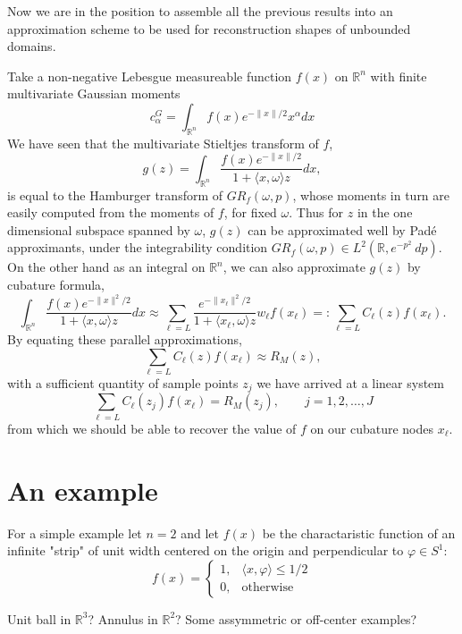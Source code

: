 \documentclass{amsart}
\theoremstyle{remark}
\numberwithin{equation}{section}
\newcommand{\RR}{\mathbb{R}}
\begin{document}



Now we are in the position to assemble all the previous results into an approximation scheme to be used for reconstruction shapes of unbounded domains.

Take a non-negative Lebesgue measureable function $f(x)$ on $\RR^n$ with finite multivariate Gaussian moments
\[
    c^G_\alpha = \int_{\RR^n} f(x)e^{-\|x\|/2} x^\alpha dx
\]
We have seen that the multivariate Stieltjes transform of $f$, 
\[
    g(z) = \int_{\RR^n} \frac{f(x)e^{-\|x\|/2}}{1 + \langle x, \omega \rangle z} dx,
\]
is equal to the Hamburger transform of $GR_f(\omega, p)$, whose moments in turn are easily computed from the moments of $f$, for fixed $\omega$. Thus for $z$ in the one dimensional subspace spanned by $\omega$, $g(z)$ can be approximated well by Pad\'e approximants, under the integrability condition $GR_f(\omega, p) \in L^2(\RR, e^{-p^2}~dp)$. On the other hand as an integral on $\RR^n$, we can also approximate $g(z)$ by cubature formula,
\[
    \int_{\RR^n} \frac{f(x)e^{-\|x\|^2/2}}{1 + \langle x, \omega \rangle z} dx 
    \approx \sum_{\ell = L} \frac{e^{-\|x_\ell\|^2/2}}{1 + \langle x_\ell, \omega \rangle z} w_\ell f(x_\ell)
    =: \sum_{\ell = L} C_\ell(z) f(x_\ell).
\]
By equating these parallel approximations, 
\[
    \sum_{\ell = L} C_\ell(z) f(x_\ell) \approx R_M(z),
\]
with a sufficient quantity of sample points $z_j$ we have arrived at a linear system
\[
    \sum_{\ell = L} C_\ell(z_j) f(x_\ell) = R_M(z_j), 
    \qquad j = 1, 2, \ldots, J
\]
from which we should be able to recover the value of $f$ on our cubature nodes $x_\ell$.





\section{An example}

For a simple example let $n = 2$ and let $f(x)$ be the charactaristic function of an infinite "strip" of unit width centered on the origin and perpendicular to $\varphi \in S^1$:
\[
    f(x) =
    \begin{cases}
        1, & \langle x, \varphi \rangle \leq 1/2 \\
        0, & \text{otherwise}
    \end{cases}
\]

Unit ball in $\RR^3$? Annulus in $\RR^2$? Some assymmetric or off-center examples?
\end{document}

